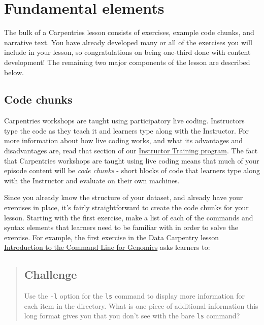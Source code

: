 \documentclass[]{book}
\begin{document}
\hypertarget{fundamental-elements}{%
\section{Fundamental elements}\label{fundamental-elements}}

The bulk of a Carpentries lesson consists of exercises, example code chunks, and
narrative text. You have already developed many or all of the exercises you will
include in your lesson, so congratulations on being one-third done with content
development! The remaining two major components of the lesson are described
below.

\hypertarget{code-chunks}{%
\subsection{Code chunks}\label{code-chunks}}

Carpentries workshops are taught using participatory live coding. Instructors
type the code as they teach it and learners type along with the Instructor. For
more information about how live coding works, and what its advantages and
disadvantages are, read that section of our \href{https://carpentries.github.io/instructor-training/14-live/index.html}{Instructor Training
program}.
The fact that Carpentries workshops are taught using live coding means that much
of your episode content will be \emph{code chunks} - short blocks of code that
learners type along with the Instructor and evaluate on their own machines.

Since you already know the structure of your dataset, and already have your
exercises in place, it's fairly straightforward to create the code chunks for
your lesson. Starting with the first exercise, make a list of each of the
commands and syntax elements that learners need to be familiar with in order to
solve the exercise. For example, the first exercise in the Data Carpentry lesson
\href{https://datacarpentry.org/shell-genomics/}{Introduction to the Command Line for
Genomics} asks learners to:

\begin{quote}
\hypertarget{challenge}{%
\subsection*{Challenge}\label{challenge}}

Use the \texttt{-l} option for the \texttt{ls} command to display more information for each
item in the directory. What is one piece of additional information this long
format gives you that you don't see with the bare \texttt{ls} command?
\end{quote}
\end{document}
